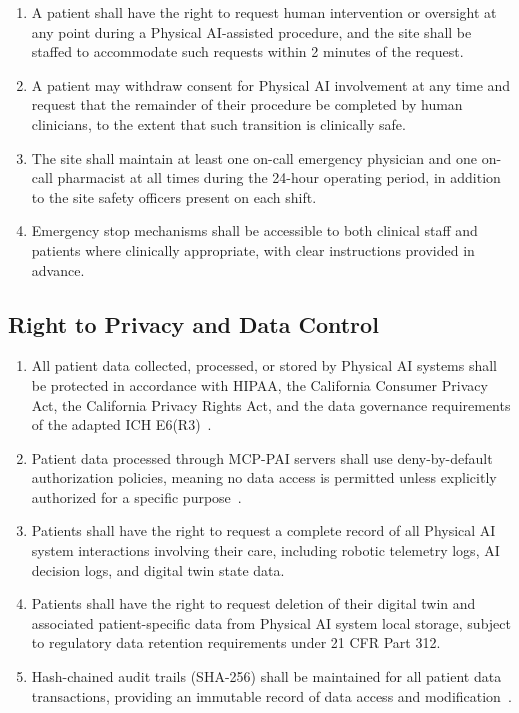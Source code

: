 \documentclass[11pt,letterpaper]{article}
\begin{document}
\begin{enumerate}[label=(\alph*)]
\item A patient shall have the right to request human intervention or oversight
  at any point during a Physical AI-assisted procedure, and the site shall be
  staffed to accommodate such requests within 2 minutes of the request.

\item A patient may withdraw consent for Physical AI involvement at any time and
  request that the remainder of their procedure be completed by human
  clinicians, to the extent that such transition is clinically safe.

\item The site shall maintain at least one on-call emergency physician and one
  on-call pharmacist at all times during the 24-hour operating period, in
  addition to the site safety officers present on each shift.

\item Emergency stop mechanisms shall be accessible to both clinical staff and
  patients where clinically appropriate, with clear instructions provided in
  advance.
\end{enumerate}

\subsection{Right to Privacy and Data Control}

\begin{enumerate}[label=(\alph*)]
\item All patient data collected, processed, or stored by Physical AI systems
  shall be protected in accordance with HIPAA, the California Consumer Privacy
  Act, the California Privacy Rights Act, and the data governance requirements
  of the adapted ICH E6(R3)~\cite{iche6r3adapt}.

\item Patient data processed through MCP-PAI servers shall use deny-by-default
  authorization policies, meaning no data access is permitted unless
  explicitly authorized for a specific purpose~\cite{iche6r3adapt}.

\item Patients shall have the right to request a complete record of all
  Physical AI system interactions involving their care, including robotic
  telemetry logs, AI decision logs, and digital twin state data.

\item Patients shall have the right to request deletion of their digital twin
  and associated patient-specific data from Physical AI system local storage,
  subject to regulatory data retention requirements under 21 CFR Part 312.

\item Hash-chained audit trails (SHA-256) shall be maintained for all patient
  data transactions, providing an immutable record of data access and
  modification~\cite{iche6r3adapt}.
\end{enumerate}
\end{document}
